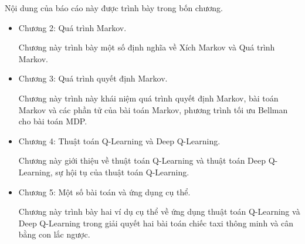 		
	Nội dung của báo cáo này được trình bày trong bốn chương. 
\begin{itemize}
	\item Chương 2: Quá trình Markov.
	
	Chương này trình bày một số định nghĩa về Xích Markov và Quá trình Markov.
	
	\item Chương 3: Quá trình quyết định Markov.
	
	Chương này trình này khái niệm quá trình quyết định Markov, bài toán Markov và các phần tử của bài toán Markov, phương trình tối ưu Bellman cho bài toán MDP.
	
	\item Chương 4: Thuật toán Q-Learning và Deep Q-Learning.
	
	Chương này giới thiệu về thuật toán Q-Learning và thuật toán Deep Q-Learning, sự hội tụ của thuật toán Q-Learning.
	
	\item Chương 5: Một số bài toán và ứng dụng cụ thể.
	
	Chương này trình bày hai ví dụ cụ thể về ứng dụng thuật toán Q-Learning và Deep Q-Learning trong giải quyết hai bài toán chiếc taxi thông minh và cân bằng con lắc ngược.
\end{itemize}
